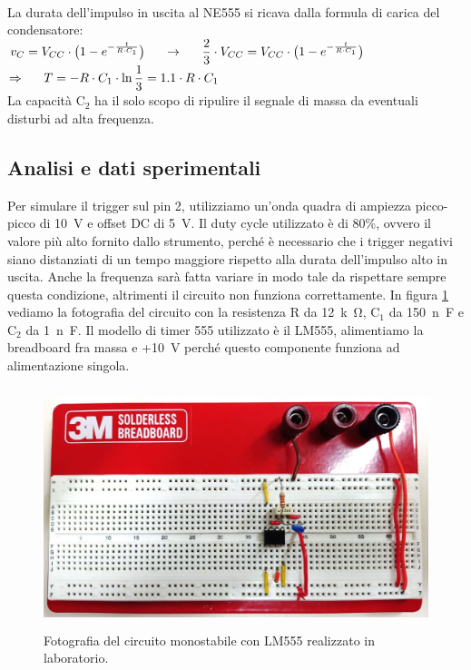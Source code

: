 \documentclass{report}
\begin{document}
\\La durata dell'impulso in uscita al NE555 si ricava dalla formula di carica del condensatore: 
\\[4pt]\indent$\displaystyle{v_C=V_{CC}\cdot\bigl(1-e^{-\frac{t}{R\cdot C_1}}\bigr)\indent\rightarrow\indent\frac{2}{3}\cdot V_{CC}=V_{CC}\cdot\bigl(1-e^{-\frac{t}{R\cdot C_1}}\bigr)}$
\\[4pt]\indent$\displaystyle{\Rightarrow\indent T=-R\cdot C_1\cdot\ln\frac{1}{3}=1.1\cdot R\cdot C_1}$
\\[4pt]La capacità $\mathrm{C_2}$ ha il solo scopo di ripulire il segnale di massa da eventuali disturbi ad alta frequenza.
\subsection{Analisi e dati sperimentali}
Per simulare il trigger sul pin 2, utilizziamo un'onda quadra di ampiezza picco-picco di \SI{10}{\volt} e offset DC di \SI{5}{\volt}. Il duty cycle utilizzato è di 80\%, ovvero il valore più alto fornito dallo strumento, perché è necessario che i trigger negativi siano distanziati di un tempo maggiore rispetto alla durata dell'impulso alto in uscita. Anche la frequenza sarà fatta variare in modo tale da rispettare sempre questa condizione, altrimenti il circuito non funziona correttamente. In figura \ref{figura:circuito2} vediamo la fotografia del circuito con la resistenza R da \SI{12}{k\ohm}, $\mathrm{C_1}$ da  \SI{150}{n\farad} e $\mathrm{C_2}$ da  \SI{1}{n\farad}. Il modello di timer 555 utilizzato è il LM555, alimentiamo la breadboard fra massa e +\SI{10}{\volt} perché questo componente funziona ad alimentazione singola.
\begin{figure}[h!]
	\centering
	\includegraphics[height=7cm]{immagini/circuito2}
	\caption{Fotografia del circuito monostabile con LM555 realizzato in laboratorio.}
	\label{figura:circuito2}
\end{figure}
\end{document}
